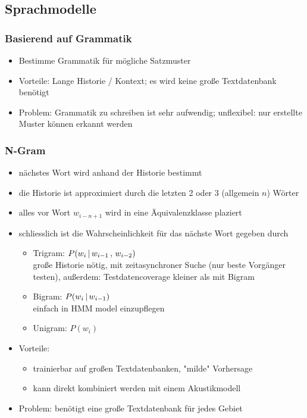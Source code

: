 \subsection{Sprachmodelle}

\subsubsection*{Basierend auf Grammatik}

\begin{itemize}
\item Bestimme Grammatik für mögliche Satzmuster
\item Vorteile: Lange Historie / Kontext; es wird keine große Textdatenbank benötigt
\item Problem: Grammatik zu schreiben ist sehr aufwendig; unflexibel: nur erstellte Muster können erkannt werden
\end{itemize}

\subsubsection*{N-Gram}

\begin{itemize}
\item nächstes Wort wird anhand der Historie bestimmt
\item die Historie ist approximiert durch die letzten 2 oder 3 (allgemein $n$) Wörter
\item alles vor Wort $w_{i-n+1}$ wird in eine Äquivalenzklasse plaziert
\item schliesslich ist die Wahrscheinlichkeit für das nächste Wort gegeben durch
\begin{itemize}
\item Trigram: $P(w_i \, | \, w_{i-1} \, , \, w_{i-2})$ \\ große Historie nötig, mit zeitasynchroner Suche (nur beste Vorgänger testen), außerdem: Testdatencoverage kleiner als mit Bigram
\item Bigram: $P(w_i \, | \, w_{i-1})$ \\ einfach in HMM model einzupflegen
\item Unigram: $P(w_i)$
\end{itemize}
\item Vorteile:
\begin{itemize}
\item trainierbar auf großen Textdatenbanken, "{}milde"{} Vorhersage
\item kann direkt kombiniert werden mit einem Akustikmodell
\end{itemize}
\item Problem: benötigt eine große Textdatenbank für jedes Gebiet
\end{itemize}

